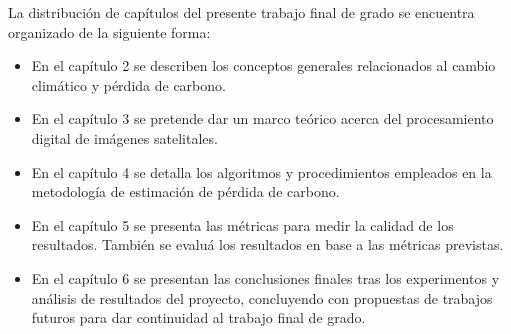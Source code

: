 La distribuci\'on de cap\'itulos del presente trabajo final de grado se encuentra organizado de la siguiente forma:
\begin{itemize}

\item En el cap\'itulo 2  se describen los conceptos generales relacionados al cambio clim\'atico y p\'erdida de carbono.

\item En el cap\'itulo 3 se pretende dar un marco te\'orico acerca del procesamiento digital de im\'agenes satelitales.
\item En el cap\'itulo 4  se detalla los algoritmos y procedimientos empleados en la metodolog\'ia de estimaci\'on de p\'erdida de carbono.

\item En el cap\'itulo 5  se presenta las m\'etricas para medir la calidad de los resultados. Tambi\'en se evalu\'a los resultados en base a las m\'etricas previstas.

\item En el cap\'itulo 6 se presentan las conclusiones finales tras los experimentos y an\'alisis de resultados del proyecto, concluyendo con propuestas de trabajos futuros para dar continuidad al trabajo final de grado.

\end{itemize}
